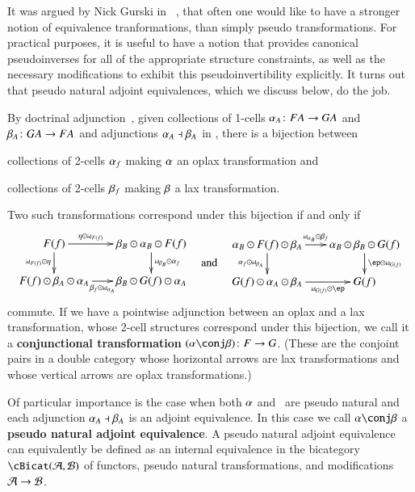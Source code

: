 \documentclass{amsart}
\begin{document}
It was argued by Nick Gurski in ~\cite{nick:tricats}, that often one would like to have a stronger notion of equivalence tranformations, than simply pseudo transformations. For practical purposes, it is useful to have a notion that provides canonical pseudoinverses for all of the appropriate structure constraints, as well as the necessary modifications to exhibit this pseudoinvertibility explicitly. It turns out that pseudo natural adjoint equivalences, which we discuss below, do the job.

By doctrinal adjunction~\cite{kelly:doc-adjn}, given collections of
1-cells $\alpha_A\colon FA\to GA$ and $\beta_A\colon GA\to FA$ and
adjunctions $\alpha_A\dashv \beta_A$ in \cB, there is a bijection between
\begin{inparaenum}
\item collections of 2-cells $\alpha_f$ making $\alpha$ an oplax
  transformation and
\item collections of 2-cells $\beta_f$ making $\beta$ a lax
  transformation.
\end{inparaenum}
Two such transformations correspond under this bijection if and only if
\begin{equation}
  \vcenter{\xymatrix@-.5pc{F(f) \ar[r]^-{\eta \odot \mbox{\tiny id}_{F(f)}}
      \ar[d]_{\mbox{\tiny id}_{F(f)}\odot \eta} &
      \be_B\odot \al_B \odot F(f) \ar[d]^{\mbox{\tiny id}_{\be_B} \odot \al_f}\\
      F(f) \odot \be_A\odot \al_A\ar[r]_-{\be_f \odot \mbox{\tiny id}_{\al_A}} &
      \be_B\odot G(f) \odot \al_A}}
  \quad\text{and}\quad
  \vcenter{\xymatrix@-.5pc{\al_B\odot F(f)\odot \be_A
      \ar[r]^-{\mbox{\tiny id}_{\al_B}\odot \be_f}\ar[d]_{\al_f \odot \mbox{\tiny id}_{\be_A}}&
      \al_B \odot \be_B \odot G(f)\ar[d]^{\ep \odot \mbox{\tiny id}_{G(f)}}\\
      G(f)\odot \al_A\odot \be_A \ar[r]_-{\mbox{\tiny id}_{G(f)} \odot \ep} & G(f)}}\label{eq:conjtrans}
\end{equation}
commute.  If we have a pointwise adjunction between an oplax and a lax
transformation, whose 2-cell structures correspond under this
bijection, we call it a \textbf{conjunctional transformation}
$(\al\conj \be)\maps F\to G$.  (These are the conjoint pairs in a
double category whose horizontal arrows are lax transformations and
whose vertical arrows are oplax transformations.)

Of particular importance is the case when both $\alpha$ and \be\ are
pseudo natural and each adjunction $\alpha_A\dashv \beta_A$ is an adjoint
equivalence.  In this case we call $\al\conj \be$ a \textbf{pseudo
  natural adjoint equivalence}.  A pseudo natural adjoint equivalence
can equivalently be defined as an internal equivalence in the
bicategory $\cBicat(\cA,\cB)$ of functors, pseudo natural
transformations, and modifications $\mathcal{A}\to\mathcal{B}$. 
\end{document}
